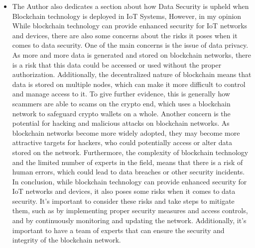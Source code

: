 \documentclass{article}
\begin{document}
\begin{itemize}
    \item The Author also dedicates a section about how Data Security is upheld when Blockchain technology is deployed in IoT Systems, However, in my opinion While blockchain technology can provide enhanced security for IoT networks and devices, there are also some concerns about the risks it poses when it comes to data security.
    One of the main concerns is the issue of data privacy. As more and more data is generated and stored on blockchain networks, there is a risk that this data could be accessed or used without the proper authorization. Additionally, the decentralized nature of blockchain means that data is stored on multiple nodes, which can make it more difficult to control and manage access to it. To give further evidence, this is generally how scammers are able to scams on the crypto end, which uses a blockchain network to safeguard crypto wallets on a whole.
    Another concern is the potential for hacking and malicious attacks on blockchain networks. As blockchain networks become more widely adopted, they may become more attractive targets for hackers, who could potentially access or alter data stored on the network.
    Furthermore, the complexity of blockchain technology and the limited number of experts in the field, means that there is a risk of human errors, which could lead to data breaches or other security incidents.
    In conclusion, while blockchain technology can provide enhanced security for IoT networks and devices, it also poses some risks when it comes to data security. It's important to consider these risks and take steps to mitigate them, such as by implementing proper security measures and access controls, and by continuously monitoring and updating the network. Additionally, it's important to have a team of experts that can ensure the security and integrity of the blockchain network.
\end{itemize}
\end{document}

